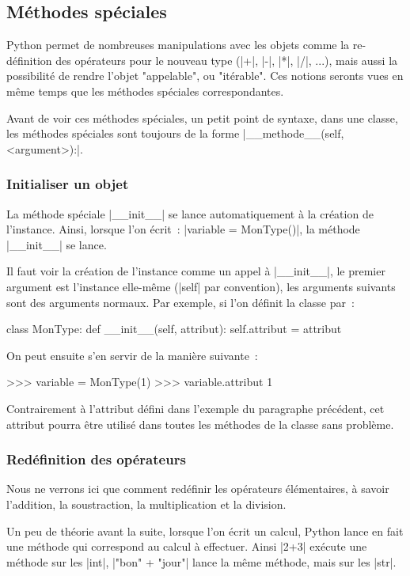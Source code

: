 	\subsection{Méthodes spéciales}
		
		Python permet de nombreuses manipulations avec les objets comme la re-définition des opérateurs pour le nouveau type (\python|+|, \python|-|, \python|*|, \python|/|, ...), mais aussi la possibilité de rendre l'objet "appelable", ou "itérable". Ces notions seronts vues en même temps que les méthodes spéciales correspondantes.
		
		Avant de voir ces méthodes spéciales, un petit point de syntaxe, dans une classe, les méthodes spéciales sont toujours de la forme \python|__methode__(self, <argument>):|.
		
		\subsubsection{Initialiser un objet}
		La méthode spéciale \python|__init__| se lance automatiquement à la création de l'instance. Ainsi, lorsque l'on écrit~: \python|variable = MonType()|, la méthode \python|__init__| se lance. 
		
		Il faut voir la création de l'instance comme un appel à \python|__init__|, le premier argument est l'instance elle-même (\python|self| par convention), les arguments suivants sont des arguments normaux. Par exemple, si l'on définit la classe par~:
		\begin{pythoncode}
			class MonType:
				def __init__(self, attribut):
					self.attribut = attribut
		\end{pythoncode}
		On peut ensuite s'en servir de la manière suivante~:
		\begin{pythoncode}
			>>> variable = MonType(1)
			>>> variable.attribut
			1
		\end{pythoncode}
		
		Contrairement à l'attribut défini dans l'exemple du paragraphe précédent, cet attribut pourra être utilisé dans toutes les méthodes de la classe sans problème.
		
		\subsubsection{Redéfinition des opérateurs}
		Nous ne verrons ici que comment redéfinir les opérateurs élémentaires, à savoir l'addition, la soustraction, la multiplication et la division.
		
		Un peu de théorie avant la suite, lorsque l'on écrit un calcul, Python lance en fait une méthode qui correspond au calcul à effectuer. Ainsi \python|2+3| exécute une méthode sur les \python|int|, \python|"bon" + "jour"| lance la même méthode, mais sur les \python|str|. \\
		
